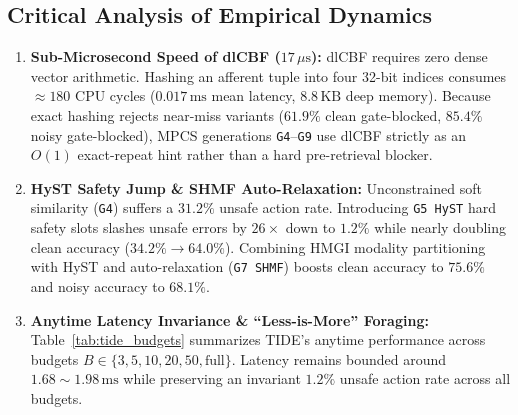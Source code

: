 \documentclass[10pt,twocolumn,letterpaper]{article}
\begin{document}
\subsection{Critical Analysis of Empirical Dynamics}
\begin{enumerate}
  \item \textbf{Sub-Microsecond Speed of dlCBF ($17\,\mu\text{s}$):}
  dlCBF requires zero dense vector arithmetic. Hashing an afferent tuple into four 32-bit indices consumes $\approx 180$ CPU cycles ($0.017\,\text{ms}$ mean latency, $8.8\,\text{KB}$ deep memory). Because exact hashing rejects near-miss variants ($61.9\%$ clean gate-blocked, $85.4\%$ noisy gate-blocked), MPCS generations \texttt{G4}--\texttt{G9} use dlCBF strictly as an $O(1)$ exact-repeat hint rather than a hard pre-retrieval blocker.
  \item \textbf{HyST Safety Jump \& SHMF Auto-Relaxation:}
  Unconstrained soft similarity (\texttt{G4}) suffers a $31.2\%$ unsafe action rate. Introducing \texttt{G5 HyST} hard safety slots slashes unsafe errors by $26\times$ down to $1.2\%$ while nearly doubling clean accuracy ($34.2\% \rightarrow 64.0\%$). Combining HMGI modality partitioning with HyST and auto-relaxation (\texttt{G7 SHMF}) boosts clean accuracy to $75.6\%$ and noisy accuracy to $68.1\%$.
  \item \textbf{Anytime Latency Invariance \& ``Less-is-More'' Foraging:}
  Table~\ref{tab:tide_budgets} summarizes TIDE's anytime performance across budgets $B \in \{3, 5, 10, 20, 50, \text{full}\}$. Latency remains bounded around $1.68 \sim 1.98\,\text{ms}$ while preserving an invariant $1.2\%$ unsafe action rate across all budgets.
\end{enumerate}

\begin{table}[h]
\centering
\caption{\textbf{TIDE Anytime Budget Curve \& Passive Net Evaluation}}
\label{tab:tide_budgets}
\end{table}
\end{document}
